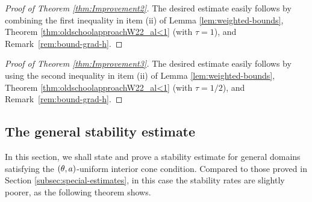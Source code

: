 \documentclass[a4paper,10pt]{amsart}
\numberwithin{equation}{section}
\begin{document}
\begin{proof}[Proof of Theorem \ref{thm:Improvement2}]
	The desired estimate easily follows by combining the first inequality in item (ii) of Lemma \ref{lem:weighted-bounds}, Theorem \ref{thm:oldschoolapproachW22_al<1} (with $\tau=1$), and Remark~\ref{rem:bound-grad-h}.
\end{proof}





\begin{proof}[Proof of Theorem \ref{thm:Improvement3}]
	The desired estimate easily follows by using the second inequality in item (ii) of Lemma \ref{lem:weighted-bounds}, Theorem \ref{thm:oldschoolapproachW22_al<1} (with $\tau=1/2$), and Remark~\ref{rem:bound-grad-h}. 
\end{proof}



\subsection{The general stability estimate}\label{subsec:general stability}
In this section, we shall state and prove a stability estimate for general domains satisfying the $(\theta, a)$-uniform interior cone condition. 
Compared to those proved in Section \ref{subsec:special-estimates}, in this case the stability rates are slightly poorer, as the following theorem shows.
\end{document}
